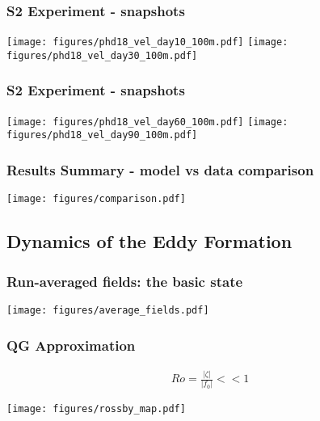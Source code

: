 \documentclass{beamer}
\begin{document}
\frame
{
  \frametitle{S2 Experiment - snapshots}
\begin{center}
\texttt{[image: figures/phd18\_vel\_day10\_100m.pdf]}
\texttt{[image: figures/phd18\_vel\_day30\_100m.pdf]}
\end{center}
}


\frame
{
  \frametitle{S2 Experiment - snapshots}
\begin{center}
\texttt{[image: figures/phd18\_vel\_day60\_100m.pdf]}
\texttt{[image: figures/phd18\_vel\_day90\_100m.pdf]}
\end{center}
}

\frame
{
  \frametitle{Results Summary - model vs data comparison}
\begin{center}
\texttt{[image: figures/comparison.pdf]}
\end{center}
}




\subsection{Dynamics of the Eddy Formation}

\frame
{
  \frametitle{Run-averaged fields: the basic state}
\begin{center}
\texttt{[image: figures/average\_fields.pdf]}
\end{center}
}

\frame
{
  \frametitle{QG Approximation}
\begin{small}
\begin{eqnarray*}
Ro = \frac{|\zeta|}{|f_0|} << 1
\label{eq:Ro}
\end{eqnarray*}
\vspace{-0.5cm}
\end{small}
\begin{center}
\texttt{[image: figures/rossby\_map.pdf]}
\end{center}
}
\end{document}
